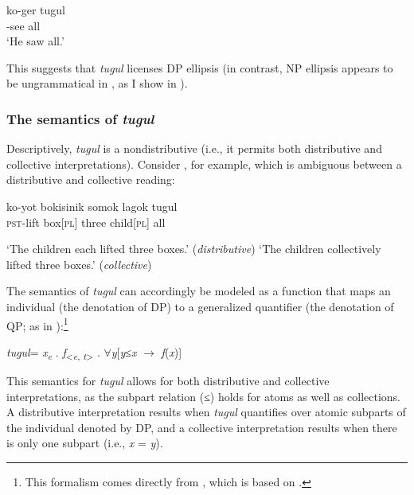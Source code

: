 \documentclass[output=paper]{LSP/langsci}
\begin{document}
\ea \label{ex:landman:tugulonown}
    \gll ko-ger tugul\\ 
	     \pst-see all\\
    \glt ‘He saw all.’
\z 

\noindent This suggests that \textit{tugul} licenses DP ellipsis (in contrast, NP ellipsis appears to be ungrammatical in , as I show in ).

\subsubsection{The semantics of \textit{tugul}}\label{sec:landman:tugulsem}
Descriptively, \textit{tugul} is a nondistributive  (i.e., it permits both distributive and collective interpretations). Consider , for example, which is ambiguous between a distributive and collective reading:
 
\ea \label{ex:landman:distcoll}
    \gll ko-yot bokisinik somok lagok tugul\\
         \textsc{pst}-lift box[\textsc{pl}] three child[\textsc{pl}] all\\ 
    \glt 
      \begin{xlist}
      \ex \label{ex:landman:dist} ‘The children each lifted three boxes.’ (\textit{distributive})
      \ex \label{ex:landman:coll} ‘The children collectively lifted three boxes.’ (\textit{collective})
      \end{xlist}
\z

The semantics of \textit{tugul} can accordingly be modeled as a function that maps an individual (the denotation of DP) to a generalized quantifier (the denotation of QP; as in \citealt{Matthewson:2001}):\footnote{This formalism comes directly from \citet{Zimmermann:2014}, which is based on \citet{Matthewson:2001}.} 

\ea \label{ex:landman:tugulden}
\textlbrackdbl\textit{tugul}\textrbrackdbl = \textlambda\textit{x}\textsubscript{\textit{e}} .  \textlambda\textit{f}\textsubscript{<\textit{e}, \textit{t}>} . $\forall$\textit{y}[\textit{y}≤\textit{x} $\rightarrow$ \textit{f}(\textit{x})]
\z

\noindent This semantics for \textit{tugul} allows for both distributive and collective interpretations, as the subpart relation (≤) holds for atoms as well as collections. A distributive interpretation results when \textit{tugul} quantifies over atomic subparts of the individual denoted by DP, and a collective interpretation results when there is only one subpart (i.e., \textit{x} = \textit{y}). 
\end{document}
